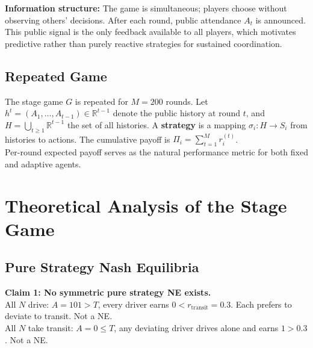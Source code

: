 \textbf{Information structure:} The game is simultaneous; players choose without observing others' decisions. After each round, public attendance $A_t$ is announced. This public signal is the only feedback available to all players, which motivates predictive rather than purely reactive strategies for sustained coordination. \\

\subsection{Repeated Game}

The stage game $G$ is repeated for $M = 200$ rounds. Let $h^t = (A_1, \ldots, A_{t-1}) \in \mathbb{R}^{t-1}$ denote the public history at round $t$, and $H = \bigcup_{t \geq 1} \mathbb{R}^{t-1}$ the set of all histories. A \textbf{strategy} is a mapping $\sigma_i : H \rightarrow S_i$ from histories to actions. The cumulative payoff is $\Pi_i = \sum_{t=1}^{M} r_i^{(t)}$. \\


Per-round expected payoff serves as the natural performance metric for both fixed and adaptive agents.\\

\section{Theoretical Analysis of the Stage Game}

\subsection{Pure Strategy Nash Equilibria}

\textbf{Claim 1: No symmetric pure strategy NE exists.} \\

All $N$ drive: $A = 101 > T$, every driver earns $0 < r_{\text{transit}} = 0.3$. Each prefers to deviate to transit. Not a NE. \\
All $N$ take transit: $A = 0 \leq T$, any deviating driver drives alone and earns $1 > 0.3$. Not a NE. \\

